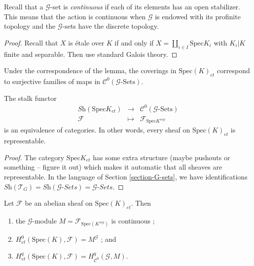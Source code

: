 Recall that a $\mathcal{G}$-set is {\it continuous} if each of its elements 
has an open stabilizer. This means that the action is continuous when 
$\mathcal{G}$ is endowed with its profinite topology and the $\mathcal{G}$-sets 
have the discrete topology.

\begin{proof}
Recall that $X$ is \'etale over $K$ if and only if  $X=\coprod_{i\in I} 
\text{Spec} K_i$ with $K_i | K$ finite and separable. Then use standard Galois 
theory.
\end{proof}

\begin{remark}
Under the correspondence of the lemma, the coverings in $\text{Spec}(K)_{et}$ 
correspond to surjective families of maps in 
$\mathcal{C}^0(\mathcal{G}\text{-Sets})$. 
\end{remark}

\begin{lemma} \label{lem:EqOfCatContGSets}
The stalk functor
$$
\begin{matrix}
\textit{Sh}(\text{Spec} K_{et}) & \longrightarrow & 
\mathcal{C}^0(\mathcal{G}\text{-Sets}) \\
\mathcal{F} & \longmapsto & \mathcal{F}_{\text{Spec} K^{sep}}
\end{matrix}
$$
is an equivalence of categories. In other words, every sheaf on 
$\text{Spec}(K)_{et}$ is representable.
\end{lemma}

\begin{proof}
The category $\text{Spec} K_{et}$ has some extra structure (maybe pushouts or 
something -- figure it out) which makes it automatic that all sheaves are 
representable. In the language of Section \ref{section-G-sets}, we have 
identifications $\textit{Sh}(\mathcal{T}_G) = 
\textit{Sh}(\mathcal{G}\textit{-Sets}) = \mathcal{G}\textit{-Sets}$.
\end{proof}

\begin{lemma}
Let $\mathcal{F}$ be an abelian sheaf on $\text{Spec}(K)_{et}$. Then
\begin{enumerate}
\item the $\mathcal{G}$-module $M = \mathcal{F}_{\text{Spec}(K^{sep})}$ is 
continuous ;
\item $H_{et}^0(\text{Spec}(K), \mathcal{F})=M^{\mathcal{G}}$ ; and
\item $H_{et}^q(\text{Spec}(K), \mathcal{F}) = H_{\mathcal{C}^0}^q(\mathcal{G}, 
M)$.
\end{enumerate}
\end{lemma}

